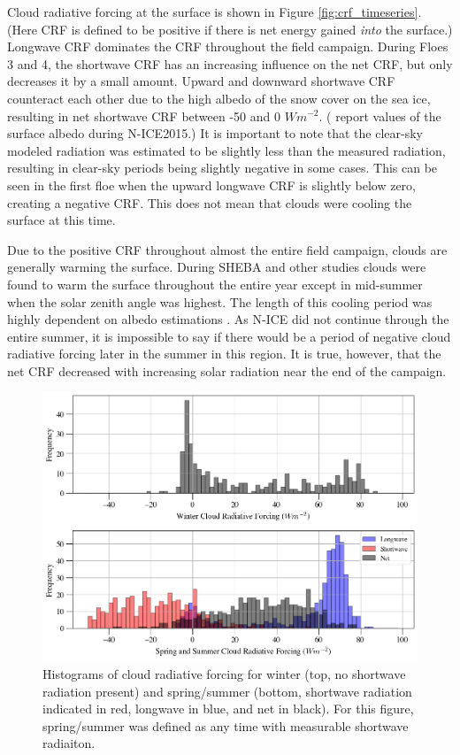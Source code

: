 Cloud radiative forcing at the surface is shown in Figure \ref{fig:crf_timeseries}. (Here CRF is defined to be positive if there is net energy gained \emph{into} the surface.) Longwave CRF dominates the CRF throughout the field campaign. During Floes 3 and 4, the shortwave CRF has an increasing influence on the net CRF, but only decreases it by a small amount. Upward and downward shortwave CRF counteract each other due to the high albedo of the snow cover on the sea ice, resulting in net shortwave CRF between -50 and 0 $Wm^{-2}$. (\citet{walden:2017} report values of the surface albedo during N-ICE2015.) It is important to note that the clear-sky modeled radiation was estimated to be slightly less than the measured radiation, resulting in clear-sky periods being slightly negative in some cases. This can be seen in the first floe when the upward longwave CRF is slightly below zero, creating a negative CRF. This does not mean that clouds were cooling the surface at this time. 

Due to the positive CRF throughout almost the entire field campaign, clouds are generally warming the surface. During SHEBA and other studies \citep{schweiger:2004, cogley:1984, walsh:1998, curry:1996} clouds were found to warm the surface throughout the entire year except in mid-summer when the solar zenith angle was highest. The length of this cooling period was highly dependent on albedo estimations \citep{intrieri:2002}. As N-ICE did not continue through the entire summer, it is impossible to say if there would be a period of negative cloud radiative forcing later in the summer in this region. It is true, however, that the net CRF decreased with increasing solar radiation near the end of the campaign.

\begin{figure}[t!]
    \centering
    \includegraphics[width=1\linewidth]{figures/chapter4/ForcingValues.png}
    \caption[Histograms of cloud radiative forcing by season.]{Histograms of cloud radiative forcing for winter (top, no shortwave radiation present) and spring/summer (bottom, shortwave radiation indicated in red, longwave in blue, and net in black). For this figure, spring/summer was defined as any time with measurable shortwave radiaiton.}
    \label{fig:crf_histo}
\end{figure}

